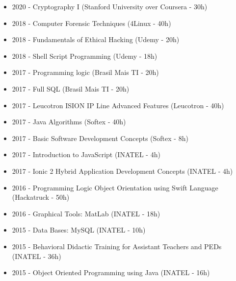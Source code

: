 \documentclass[10pt,a4paper,ragged2e, normalphoto]{altacv}
\begin{document}
\begin{fullwidth}

\begin{itemize}
    \item 2020 - Cryptography I (Stanford University over Coursera - 30h)
    \item 2018 - Computer Forensic Techniques (4Linux - 40h)
    \item 2018 - Fundamentals of Ethical Hacking (Udemy - 20h)
    \item 2018 - Shell Script Programming (Udemy - 18h)
    \item 2017 - Programming logic (Brasil Mais TI - 20h)
    \item 2017 - Full SQL (Brasil Mais TI - 20h)
    \item 2017 - Leucotron ISION IP Line Advanced Features (Leucotron - 40h)
    \item 2017 - Java Algorithms (Softex - 40h)
    \item 2017 - Basic Software Development Concepts (Softex - 8h)
    \item 2017 - Introduction to JavaScript (INATEL - 4h)
    \item 2017 - Ionic 2 Hybrid Application Development Concepts (INATEL - 4h)
    \item 2016 - Programming Logic Object Orientation using Swift Language (Hackatruck - 50h)
    \item 2016 - Graphical Tools: MatLab (INATEL - 18h)
    \item 2015 - Data Bases: MySQL (INATEL - 10h)
    \item 2015 - Behavioral Didactic Training for Assistant Teachers and PEDs (INATEL - 36h)
    \item 2015 - Object Oriented Programming using Java (INATEL - 16h)
\end{itemize}

\end{fullwidth}
\end{document}
